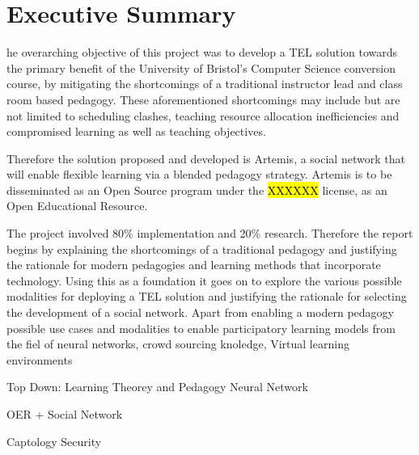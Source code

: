 %
%
%

\chapter*{Executive Summary}
\begin{SingleSpace}
he overarching objective of this project was to develop a TEL solution towards the primary benefit of the University of Bristol's Computer Science conversion course, by mitigating the shortcomings of a traditional instructor lead and class room based pedagogy. These aforementioned shortcomings may include but are not limited to scheduling clashes, teaching resource allocation inefficiencies and compromised learning as well as teaching objectives.

Therefore the solution proposed and developed is Artemis, a social network that will enable flexible learning via a blended pedagogy strategy. Artemis is to be disseminated as an Open Source program under the \hl{XXXXXX} license, as an Open Educational Resource.


The project involved 80\% implementation and 20\% research. Therefore the report begins by explaining the shortcomings of a traditional pedagogy and justifying the rationale for modern pedagogies and learning methods that incorporate technology. Using this as a foundation it goes on to explore the various possible modalities for deploying a TEL solution and justifying the rationale for selecting the development of a social network. Apart from enabling a modern pedagogy possible use cases and modalities to enable participatory learning models from the fiel of neural networks, crowd sourcing knoledge, Virtual learning environments 


Top Down:
Learning Theorey and Pedagogy
Neural Network

OER + Social Network

Captology
Security





\end{SingleSpace}
\clearpage